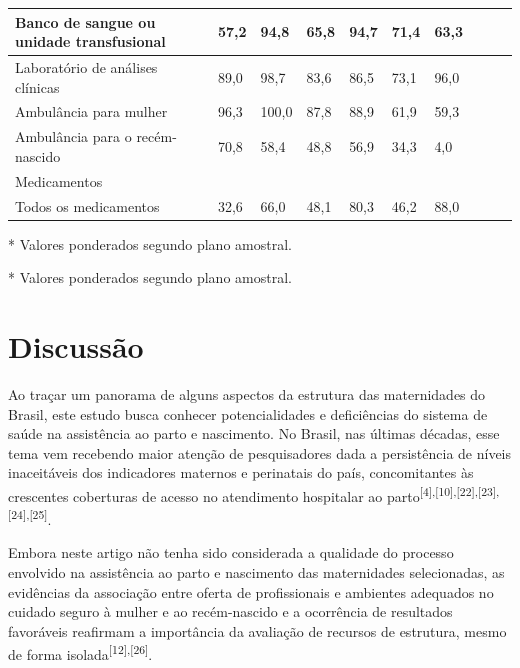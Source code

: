 \documentclass{article}
\begin{document}
\begin{table}
\begin{xtabular}{ l l | l | l l | l | l | l | l | l }
Banco de sangue ou unidade transfusional
& 57,2
& 94,8
& 65,8
& 94,7
& 71,4
& 63,3
\\ \hline

Laboratório de análises clínicas
& 89,0
& 98,7
& 83,6
& 86,5
& 73,1
& 96,0
\\ \hline

Ambulância para mulher
& 96,3
& 100,0
& 87,8
& 88,9
& 61,9
& 59,3
\\ \hline

Ambulância para o recém-nascido
& 70,8
& 58,4
& 48,8
& 56,9
& 34,3
& 4,0
\\ \hline

Medicamentos
&
&
&
&
&
&
\\ \hline

Todos os medicamentos
& 32,6
& 66,0
& 48,1
& 80,3
& 46,2
& 88,0
\\ \hline

\end{xtabular}
\end{table}

* Valores ponderados segundo plano amostral.

* Valores ponderados segundo plano amostral.

\section{Discussão}

Ao traçar um panorama de alguns aspectos da estrutura das maternidades do
Brasil,
este estudo busca conhecer potencialidades e deficiências do sistema de saúde na
assistência ao parto e nascimento. No Brasil, nas últimas décadas, esse tema vem
recebendo maior atenção de pesquisadores dada a persistência de níveis
inaceitáveis
dos indicadores maternos e perinatais do país, concomitantes às crescentes
coberturas de acesso no atendimento hospitalar ao parto\textsuperscript{[}\textsuperscript{4}\textsuperscript{]}\textsuperscript{,}\textsuperscript{[}\textsuperscript{10}\textsuperscript{]}\textsuperscript{,}\textsuperscript{[}\textsuperscript{22}\textsuperscript{]}\textsuperscript{,}\textsuperscript{[}\textsuperscript{23}\textsuperscript{]}\textsuperscript{,}\textsuperscript{[}\textsuperscript{24}\textsuperscript{]}\textsuperscript{,}\textsuperscript{[}\textsuperscript{25}\textsuperscript{]}.

Embora neste artigo não tenha sido considerada a qualidade do processo envolvido
na
assistência ao parto e nascimento das maternidades selecionadas, as evidências
da
associação entre oferta de profissionais e ambientes adequados no cuidado seguro
à
mulher e ao recém-nascido e a ocorrência de resultados favoráveis reafirmam a
importância da avaliação de recursos de estrutura, mesmo de forma isolada\textsuperscript{[}\textsuperscript{12}\textsuperscript{]}\textsuperscript{,}\textsuperscript{[}\textsuperscript{26}\textsuperscript{]}.
\end{document}
